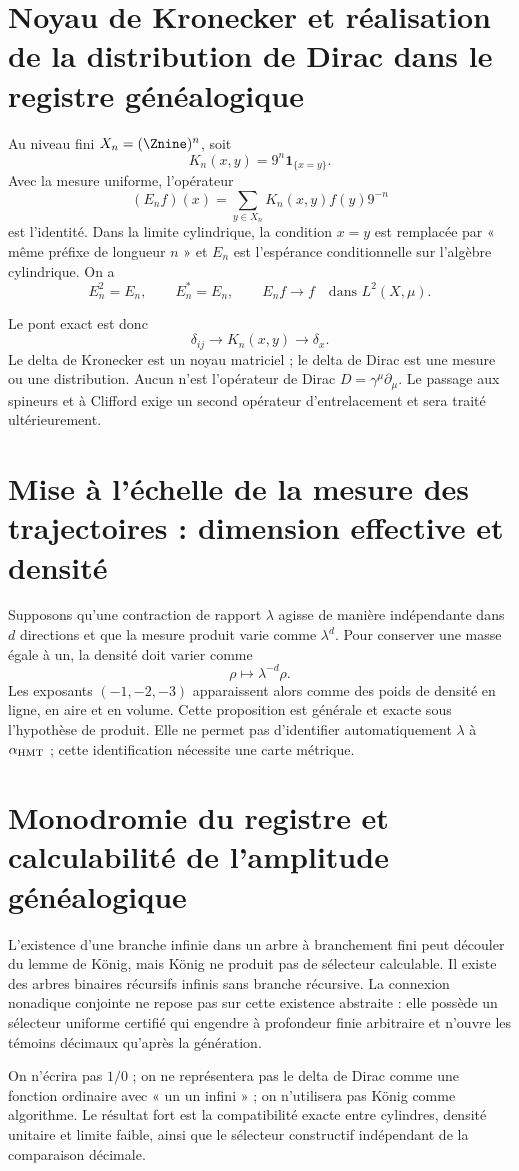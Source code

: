 \section{Noyau de Kronecker et réalisation de la distribution de Dirac dans le registre généalogique}

Au niveau fini \(X_n=(\Znine)^n\), soit
\[
K_n(x,y)=9^n\mathbf1_{\{x=y\}}.
\]
Avec la mesure uniforme, l'opérateur
\[
(E_nf)(x)=\sum_{y\in X_n}K_n(x,y)f(y)9^{-n}
\]
est l'identité. Dans la limite cylindrique, la condition \(x=y\) est remplacée par
« même préfixe de longueur \(n\) » et \(E_n\) est l'espérance conditionnelle sur
l'algèbre cylindrique. On a
\[
E_n^2=E_n,\qquad E_n^*=E_n,\qquad E_nf\to f
\quad\text{dans }L^2(X,\mu).
\]

Le pont exact est donc
\[
\delta_{ij}
\longrightarrow K_n(x,y)
\longrightarrow\delta_x.
\]
Le delta de Kronecker est un noyau matriciel ; le delta de Dirac est une mesure ou
une distribution. Aucun n'est l'opérateur de Dirac
\(D=\gamma^\mu\partial_\mu\). Le passage aux spineurs et à Clifford exige
un second opérateur d'entrelacement et sera traité ultérieurement.

\section{Mise à l'échelle de la mesure des trajectoires : dimension effective et densité}

Supposons qu'une contraction de rapport \(\lambda\) agisse de manière indépendante
dans \(d\) directions et que la mesure produit varie comme \(\lambda^d\). Pour
conserver une masse égale à un, la densité doit varier comme
\[
\rho\longmapsto\lambda^{-d}\rho.
\]
Les exposants \((-1,-2,-3)\) apparaissent alors comme des poids de densité en ligne,
en aire et en volume. Cette proposition est générale et exacte sous l'hypothèse de
produit. Elle ne permet pas d'identifier automatiquement \(\lambda\) à
\(\alpha_{\rm HMT}\) ; cette identification nécessite une carte métrique.

\section{Monodromie du registre et calculabilité de l'amplitude généalogique}

L'existence d'une branche infinie dans un arbre à branchement fini peut
découler du lemme de König, mais König ne produit pas de sélecteur calculable. Il existe
des arbres binaires récursifs infinis sans branche récursive. La connexion nonadique
conjointe ne repose pas sur cette existence abstraite : elle possède un sélecteur uniforme
certifié qui engendre à profondeur finie arbitraire et n'ouvre les témoins
décimaux qu'après la génération.

\begin{falsadorBox}[title={Trois confusions interdites}]
On n'écrira pas \(1/0\) ; on ne représentera pas le delta de Dirac comme une fonction
ordinaire avec « un un infini » ; on n'utilisera pas König comme algorithme. Le résultat
fort est la compatibilité exacte entre cylindres, densité unitaire et limite
faible, ainsi que le sélecteur constructif indépendant de la comparaison décimale.
\end{falsadorBox}

